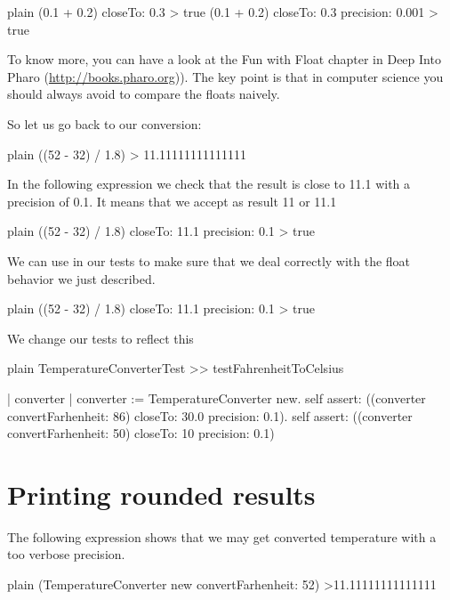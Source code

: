 \documentclass[10pt,twoside,english]{_support/latex/sbabook/sbabook}
\begin{document}
\begin{displaycode}{plain}
(0.1 + 0.2) closeTo: 0.3
> true
(0.1 + 0.2) closeTo: 0.3 precision: 0.001
> true
\end{displaycode}

To know more, you can have a look at the Fun with Float chapter in Deep Into Pharo (\url{http://books.pharo.org})). The key point is that in computer science you should always avoid to compare the floats naively.

So let us go back to our conversion:

\begin{displaycode}{plain}
((52 - 32) / 1.8)
> 11.11111111111111
\end{displaycode}

In the following expression we check that the result is close to 11.1 with a precision of 0.1. It means that we
accept as result 11 or 11.1

\begin{displaycode}{plain}
((52 -  32) / 1.8) closeTo: 11.1 precision: 0.1
> true
\end{displaycode}

We can use  in our tests to make sure that we deal correctly with the float behavior we just described.

\begin{displaycode}{plain}
((52 -  32) / 1.8) closeTo: 11.1 precision: 0.1
> true
\end{displaycode}

We change our tests to reflect this

\begin{displaycode}{plain}
TemperatureConverterTest >> testFahrenheitToCelsius

    | converter |
    converter := TemperatureConverter new.
    self assert: ((converter convertFarhenheit: 86) closeTo: 30.0 precision: 0.1).
    self assert: ((converter convertFarhenheit: 50) closeTo: 10 precision: 0.1)
\end{displaycode}
\section{Printing rounded results}
The following expression shows that we may get converted temperature with a too verbose precision.

\begin{displaycode}{plain}
(TemperatureConverter new convertFarhenheit: 52)
>11.11111111111111
\end{displaycode}
\end{document}
